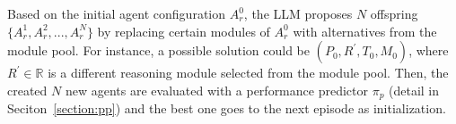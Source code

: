 Based on the initial agent configuration $A_r^0$, the LLM proposes $N$ offspring $\{A_r^1,A_r^2,...,A_r^N\}$ by replacing certain modules of $A_r^0$ with alternatives from the module pool. 
For instance, a possible solution could be $(P_0,R^{'},T_0,M_0)$, where $R^{'} \in \mathbb{R}$ is a different reasoning module selected from the module pool.
Then, the created $N$ new agents are evaluated with a performance predictor $\pi_p$ (detail in Seciton~\ref{section:pp}) and the best one goes to the next episode as initialization.

